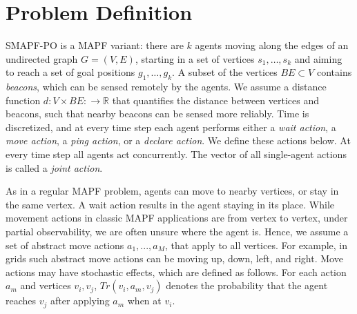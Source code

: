 \documentclass[letterpaper]{article} %
\begin{document}






\section{Problem Definition}

SMAPF-PO is a MAPF variant: there are $k$ agents moving along the edges of an undirected graph $G=(V,E)$, starting in a set of vertices $s_1,\ldots, s_k$ and 
aiming to reach a set of goal positions $g_1,\ldots, g_k$.
A subset of the vertices $BE\subset V$ contains \emph{beacons}, which can be sensed remotely by the agents. 
We assume a distance function $d:V\times BE:\rightarrow\mathbb{R}$ that quantifies the distance between vertices and beacons, such that nearby beacons can be sensed more reliably. Time is discretized, and at every time step each agent performs either a \emph{wait action}, a \emph{move action}, a \emph{ping action}, or a \emph{declare action}. We define these actions below. 
At every time step all agents act concurrently. The vector of all single-agent actions is called a \emph{joint action}. 

 As in a regular MAPF problem, agents can move to nearby vertices, or stay in the same vertex.
A wait action results in the agent staying in its place.
While movement actions in classic MAPF applications are from vertex to vertex, under partial observability, we are often unsure where the agent is. Hence, we assume a set of abstract move actions $a_1,...,a_M$, that apply to all vertices. 
For example, in grids such abstract move actions can be moving up, down, left, and right.  
Move actions may have stochastic effects, which are defined as follows. 
For each action $a_m$ and vertices $v_i,v_j$, $Tr(v_i,a_m,v_j)$ denotes the probability that the agent reaches $v_j$ after applying $a_m$ when at $v_i$. 

\end{document}
